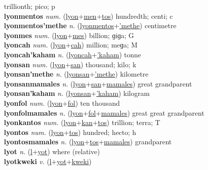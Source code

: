trillionth; pico; p \label{lyonmenkantos} \\
\textbf{lyonmentos} \textit{num.} (\hyperref[lyon]{lyon}+\hyperref[men]{men}+\hyperref[tos]{tos})
hundredth; centi; c \label{lyonmentos} \\
\textbf{lyonmentos'methe} \textit{n.} (\hyperref[lyonmentos]{lyonmentos}+\hyperref['methe]{'methe})
centimetre \label{lyonmentos'methe} \\
\textbf{lyonmes} \textit{num.} (\hyperref[lyon]{lyon}+\hyperref[mes]{mes})
billion; ɡiɡa; G \label{lyonmes} \\
\textbf{lyoncah} \textit{num.} (\hyperref[lyon]{lyon}+\hyperref[cah]{cah})
million; meɡa; M \label{lyoncah} \\
\textbf{lyoncah'kaham} \textit{n.} (\hyperref[lyoncah]{lyoncah}+\hyperref['kaham]{'kaham})
tonne \label{lyoncah'kaham} \\
\textbf{lyonsan} \textit{num.} (\hyperref[lyon]{lyon}+\hyperref[san]{san})
thousand; kilo; k \label{lyonsan} \\
\textbf{lyonsan'methe} \textit{n.} (\hyperref[lyonsan]{lyonsan}+\hyperref['methe]{'methe})
kilometre \label{lyonsan'methe} \\
\textbf{lyonsanmamales} \textit{n.} (\hyperref[lyon]{lyon}+\hyperref[san]{san}+\hyperref[mamales]{mamales})
great grandparent \label{lyonsanmamales} \\
\textbf{lyonsan'kaham} \textit{n.} (\hyperref[lyonsan]{lyonsan}+\hyperref['kaham]{'kaham})
kilogram \label{lyonsan'kaham} \\
\textbf{lyonfol} \textit{num.} (\hyperref[lyon]{lyon}+\hyperref[fol]{fol})
ten thousand \label{lyonfol} \\
\textbf{lyonfolmamales} \textit{n.} (\hyperref[lyon]{lyon}+\hyperref[fol]{fol}+\hyperref[mamales]{mamales})
great great grandparent \label{lyonfolmamales} \\
\textbf{lyonkantos} \textit{num.} (\hyperref[lyon]{lyon}+\hyperref[kan]{kan}+\hyperref[tos]{tos})
trillion; terra; T \label{lyonkantos} \\
\textbf{lyontos} \textit{num.} (\hyperref[lyon]{lyon}+\hyperref[tos]{tos})
hundred; hecto; h \label{lyontos} \\
\textbf{lyontosmamales} \textit{n.} (\hyperref[lyon]{lyon}+\hyperref[tos]{tos}+\hyperref[mamales]{mamales})
grandparent \label{lyontosmamales} \\
\textbf{lyot} \textit{n.} (\hyperref[l]{l}+\hyperref[yot]{yot})
where (relative) \label{lyot} \\
\textbf{lyotkweki} \textit{v.} (\hyperref[l]{l}+\hyperref[yot]{yot}+\hyperref[kweki]{kweki})
